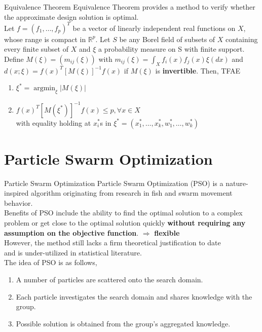 \documentclass{beamer}
\DeclareMathOperator*{\argmin}{argmin}
\begin{document}
\begin{frame}{Equivalence Theorem}
  Equivalence Theorem provides a method to verify whether the approximate design solution is optimal.\\
  \vspace{3mm}
  Let $f=(f_1, \ldots, f_p)^T$ be a vector of linearly independent real functions on $X$, whose range is compact in $\mathbb{R}^p$. Let $S$ be any Borel field of subsets of $X$ containing every finite subset of $X$ and $\xi$ a probability measure on S with finite support.\\
  Define $M(\xi) = \left( m_{ij}(\xi) \right)$ with $m_{ij}(\xi)=\int_{X}f_i(x)f_j(x)\xi(dx)$ and $d(x;\xi)=f(x)^T\left[M(\xi)\right]^{-1}f(x)$ if $M(\xi)$ is \textbf{invertible}. Then, TFAE\\
  \begin{enumerate}
    \item $\xi^* = \argmin_{\xi}\left| M(\xi) \right|$
    \item $f(x)^T\left[M(\xi^*)\right]^{-1}f(x) \leq p, \forall x \in X$\\
    with equality holding at $x_i^*$s in $\xi^*=\left( x_1^*, \ldots , x_k^*, w_1^*, \ldots , w_k^* \right)$
  \end{enumerate}
\end{frame}

\section{Particle Swarm Optimization}

\begin{frame}{Particle Swarm Optimization}
  Particle Swarm Optimization (PSO) is a nature-inspired algorithm originating from research in fish and swarm movement behavior.\\
  \vspace{3mm}
  Benefits of PSO include the ability to find the optimal solution to a complex problem or get close to the optimal solution quickly \textbf{without requiring any assumption on the objective function}. $\Rightarrow$ \textbf{flexible}\\
  \vspace{3mm}
  However, the method still lacks a firm theoretical justification to date\\
  and is under-utilized in statistical literature.\\
  \vspace{3mm}
  The idea of PSO is as follows,\\
  \begin{enumerate}
    \item A number of particles are scattered onto the search domain.
    \item Each particle investigates the search domain and shares knowledge with the group.
    \item Possible solution is obtained from the group's aggregated knowledge.
  \end{enumerate}
\end{frame}
\end{document}
